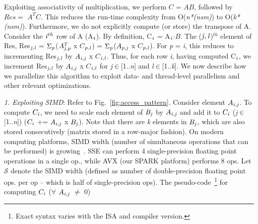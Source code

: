     Exploiting associativity of multiplication, we perform $C$ = $AB$, 
    followed by $Res =$ $A^TC$. This reduces the run-time complexity from
    O({\it{n*(nsm)}}) to O({\it{k*(nsm)}}). Furthermore, we do not
    explicitly compute (or store) the transpose of A.  Consider the
    ${\it{i}}^{th}$ row of A (A$_{\it{i}}$). 
    By definition, 
    C$_{\it{i}}$ %
    = A$_{\it{i}}$$\cdot$$B$.
     The (${\it{j}},{\it{l}}$)$^{th}$ element of Res,
    Res$_{{\it{j}},{\it{l}}}$ =
    $\Sigma_{\it{p}}$($A^T_{{\it{j}},{\it{p}}}$ x $C$$_{{\it{p}},{\it{l}}}$) = 
    $\Sigma_{\it{p}}$($A_{{\it{p}},{\it{j}}}$ x
    $C$$_{{\it{p}},{\it{l}}}$).
    For {\it{p}} = {\it{i}}, this reduces to incrementing
    Res$_{{\it{j}},{\it{l}}}$ by $A_{{\it{i}},{\it{j}}}$ x
    $C$$_{{\it{i}},{\it{l}}}$. 
    Thus, for each row {\it{i}}, 
    having computed C$_{\it{i}}$, we
    increment Res$_{{\it{j}},{\it{l}}}$ 
    by $A_{{\it{i}},{\it{j}}}$ x $C$$_{{\it{i}},{\it{l}}}$
    for {\it{j}}$\in$[1..{\it{n}}] and {\it{l}}$\in$[1..{\it{k}}].
     We now describe how we parallelize this algorithm to exploit
     data- and thread-level parallelism and other relevant
     optimizations.





     \vspace*{0.1in}
     {\it{1. Exploiting SIMD}}: Refer to Fig.~\ref{fig:access_pattern}. 
     Consider element $A_{{\it{i}},{\it{j}}}$. To compute
     $C_{\it{i}}$, we need to scale each element of
     $B_{{\it{j}}}$ by  $A_{{\it{i}},{\it{j}}}$ and add it to
     $C_{\it{i}}$ ({\it{j}}$\in$[1..{\it{n}}]) ($C_{\it{i}}$ +=
     $A_{{\it{i}},{\it{j}}}$ x $B_{{\it{j}}}$). Note that there are
     {\it{k}} elements in $B_{{\it{j}}}$, which are also stored
     consecutively (matrix stored in a row-major fashion).
     On modern computing platforms, SIMD width (number of simultaneous
     operations that can be performed) is
     growing~\cite{intel1,intel2}. SSE can perform 4
     single-precision floating point operations in a single op., while
     AVX (our SPARK platform) performs 8 ops. Let $\mathcal{S}$ denote the SIMD width
     (defined as number of double-precision floating point ops. per op
     -- which is half of single-precision ops).
     The pseudo-code~\footnote{Exact syntax varies with the ISA and
     compiler version.} for computing $C_{\it{i}}$ ($\forall$ $A_{{\it{i}},{\it{j}}}$ $\neq$ 0)
     \vspace*{0.05in}

